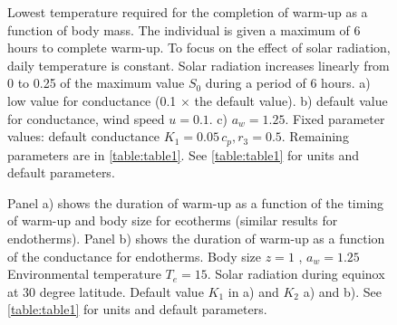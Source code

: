\begin{figure}[H]
\begin{center}
\caption{
    \setstretch{\stretchby}
	Lowest temperature required for the completion of warm-up as a function of body mass.
	The individual is given a maximum of 6 hours to complete warm-up.
	To focus on the effect of solar radiation, daily temperature is constant.
	Solar radiation increases linearly from 0 to 0.25 of the maximum value $S_0$ during a period of 6 hours.
	a)  low value for conductance (0.1 $\times$ the default value).
	b) default value for conductance, wind speed  $u = 0.1$.
	c)  $a_w = 1.25$.
	Fixed parameter values: default conductance $K_1 = 0.05 \, c_p, r_3 = 0.5$.
	Remaining parameters are in \cref{table:table1}.
	See \cref{table:table1} for units and default parameters.
}
\label{fig3}
\end{center}
\end{figure}
%
\begin{figure}[H]
\begin{center}
\caption{
    \setstretch{\stretchby}
	Panel a) shows the duration of warm-up as a function of the timing of warm-up and body size for ecotherms (similar results for endotherms).
	Panel b) shows the duration of warm-up as a function of the conductance for endotherms. Body size $z = 1$ , $a_w = 1.25$
	Environmental temperature $ T_e = 15$.
	Solar radiation during equinox at 30 degree latitude.
	Default value $K_1$ in a) and $K_2$ a) and b).
	See \cref{table:table1} for units and default parameters.
}
\label{fig4}
\end{center}
\end{figure}
